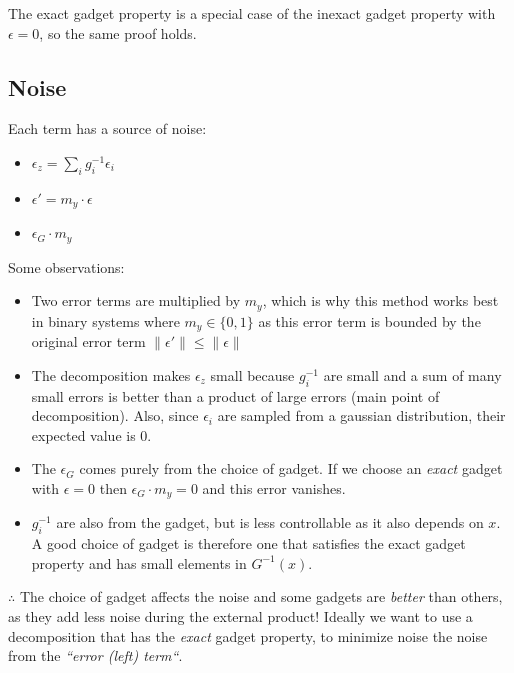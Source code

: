 \begin{remark}
    The exact gadget property is a special case of the inexact gadget property with $\epsilon = 0$, so the same proof holds. %
\end{remark}

\subsection{Noise}
Each term has a source of noise:
\begin{itemize}
    \item $\epsilon_z = \sum_i g^{-1}_i\epsilon_i$
    \item $\epsilon' = m_y\cdot \epsilon$
    \item $\epsilon_G\cdot m_y$
\end{itemize}

\noindent Some observations:
\begin{itemize}
    \item Two error terms are multiplied by $m_y$, which is why this method works best in binary systems where $m_y \in \{0, 1\}$ as this error term is bounded by the original error term $\|\epsilon'\| \leq \|\epsilon\|$
    \item The decomposition makes $\epsilon_z$ small because $g^{-1}_i$ are small and a sum of many small errors is better than a product of large errors (main point of decomposition). Also, since $\epsilon_i$ are sampled from a gaussian distribution, their expected value is $0$.
    \item The $\epsilon_G$ comes purely from the choice of gadget. If we choose an \textit{exact} gadget with $\epsilon = 0$ then $\epsilon_G\cdot m_y = 0$ and this error vanishes.
    \item $g^{-1}_i$ are also from the gadget, but is less controllable as it also depends on $x$. A good choice of gadget is therefore one that satisfies the exact gadget property and has small elements in $G^{-1}(x)$. 
\end{itemize}

$\therefore$ The choice of gadget affects the noise and some gadgets are \textit{better} than others, as they add less noise during the external product! Ideally we want to use a decomposition that has the \textit{exact} gadget property, to minimize noise the noise from the \textit{``error (left) term``}.

